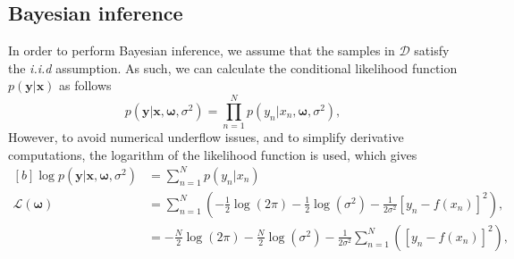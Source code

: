 \documentclass{article}
\begin{document}
\subsection{Bayesian inference}

In order to perform Bayesian inference, we assume that the samples in $\mathcal{D}$ satisfy the \emph{i.i.d} assumption. As such, we can calculate the conditional likelihood function $p(\mathbf{y} \vert \mathbf{x})$ as follows
\begin{equation}
p(\mathbf{y} \vert \mathbf{x}, \boldsymbol\omega, \sigma^2) = \prod_{n=1}^{N} p(y_n \vert x_n, \boldsymbol\omega, \sigma^2),
\end{equation}
However, to avoid numerical underflow issues, and to simplify derivative computations, the logarithm of the likelihood function is used, which gives
\begin{equation}
\begin{aligned}[b]
\log p(\mathbf{y} \vert \mathbf{x}, \boldsymbol\omega, \sigma^2) &= \sum_{n=1}^{N} p(y_n \vert x_n) \\
\mathcal{L}(\boldsymbol\omega) &= \sum_{n=1}^{N} \left( -\frac{1}{2}\log \left( 2\pi \right) -\frac{1}{2}\log \left( \sigma^2 \right) - \frac{1}{2\sigma^2} \left[ y_n - f(x_n)\right] ^2 \right), \\
&=  -\frac{N}{2}\log \left( 2\pi \right) -\frac{N}{2}\log \left( \sigma^2 \right) - \frac{1}{2\sigma^2}\sum_{n=1}^{N} \left( \left[ y_n - f(x_n)\right] ^2 \right),
\end{aligned}
\end{equation}
\end{document}
